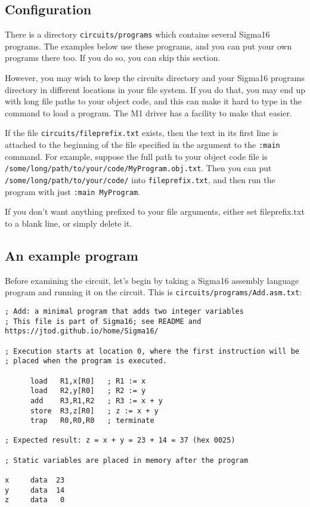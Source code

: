 \documentclass[11pt]{article}
\begin{document}
\subsection{Configuration}
\label{sec:org78ee250}

There is a directory \texttt{circuits/programs} which contains several
Sigma16 programs.  The examples below use these programs, and you can
put your own programs there too.  If you do so, you can skip this
section.

However, you may wish to keep the circuits directory and your Sigma16
programs directory in different locations in your file system.  If you
do that, you may end up with long file paths to your object code, and
this can make it hard to type in the command to load a program.  The
M1 driver has a facility to make that easier.

If the file \texttt{circuits/fileprefix.txt} exists, then the text in its
first line is attached to the beginning of the file specified in the
argument to the \texttt{:main} command.  For example, suppose the full path
to your object code file is
\texttt{/some/long/path/to/your/code/MyProgram.obj.txt}.  Then you can put
\texttt{/some/long/path/to/your/code/} into \texttt{fileprefix.txt}, and then
run the program with just \texttt{:main MyProgram}.

If you don't want anything prefixed to your file arguments, either set
fileprefix.txt to a blank line, or simply delete it.

\subsection{An example program}
\label{sec:org1853d9b}

Before examining the circuit, let's begin by taking a Sigma16 assembly
language program and running it on the circuit.  This is
\texttt{circuits/programs/Add.asm.txt}:

\begin{verbatim}
; Add: a minimal program that adds two integer variables
; This file is part of Sigma16; see README and https://jtod.github.io/home/Sigma16/

; Execution starts at location 0, where the first instruction will be
; placed when the program is executed.

      load   R1,x[R0]   ; R1 := x
      load   R2,y[R0]   ; R2 := y
      add    R3,R1,R2   ; R3 := x + y
      store  R3,z[R0]   ; z := x + y
      trap   R0,R0,R0   ; terminate

; Expected result: z = x + y = 23 + 14 = 37 (hex 0025)

; Static variables are placed in memory after the program

x     data  23
y     data  14
z     data   0
\end{verbatim}
\end{document}

